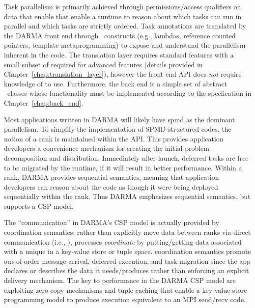 Task parallelism is primarily achieved through permissions/access qualifiers
on data that enable that enable a runtime to reason about which tasks can run in parallel and which tasks are strictly ordered.
Task annotations are translated by the DARMA front end through \CC\ constructs (e.g., lambdas, reference counted pointers, template
metaprogramming) to expose and understand the parallelism inherent in the code.  
The \gls{translation layer} requires  standard features with a small subset of
 required for advanced features (details provided in Chapter~\ref{chap:translation_layer}), 
however the \gls{front end} \gls{API} does \emph{not} require knowledge of  to use. 
Furthermore, the \gls{back end} is a simple set of abstract \CC\ classes whose functionality must be implemented
according to the specfication in Chapter~\ref{chap:back_end}.


Most applications written in DARMA will likely have \gls{spmd} as the dominant parallelism.
To simplify the implementation of SPMD-structured codes, the notion of a \gls{rank} is maintained within the \gls{API}.   
This provides application developers a convenience mechanism for creating
the initial problem decomposition and distribution.  
Immediately after launch, deferred tasks are free to be migrated by the runtime, if it will result in better performance. 
Within a \gls{rank}, DARMA provides \gls{sequential semantics},  meaning that application developers can reason about the code as
though it were being deployed sequentially within the rank.   
Thus DARMA emphasizes sequential semantics, but supports a CSP model.


The ``communication'' in DARMA's CSP model is actually provided by \gls{coordination semantics}:  
rather than explicitly move data between ranks via direct communication
(i.e.,  ), processes \emph{coordinate} by putting/getting data associated with a unique  in a
\gls{key-value store} or \gls{tuple space}.  
\Gls{coordination semantics} promote out-of-order message arrival, deferred execution, and task migration
since the app declares or describes the data it needs/produces rather than enforcing an explicit delivery mechanism.
The key to performance in the DARMA CSP model are exploiting zero-copy mechanisms and tuple caching that enable a key-value store programming model
to produce execution equivalent to an MPI send/recv code. 

